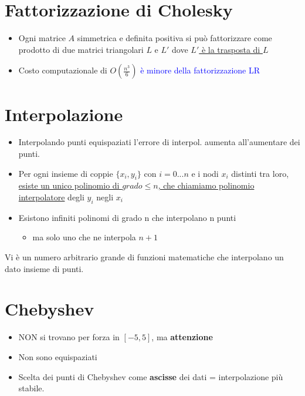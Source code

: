 \documentclass{article}
\begin{document}
	\section{Fattorizzazione di Cholesky}

		\begin{itemize}
			\item Ogni matrice $A$ simmetrica e definita positiva si può fattorizzare come prodotto di due matrici triangolari $L$ e $L'$ dove \underline{ $L'$ è la trasposta di $L$ }
			\item Costo computazionale di $O ( \frac{n^3}{6} )$ \textcolor{blue}{ è minore della fattorizzazione LR }
		\end{itemize}

	\section{Interpolazione}

		\begin{itemize}
			\item Interpolando punti equispaziati l'errore di interpol. aumenta all'aumentare dei punti.
			\item Per ogni insieme di coppie $\{ x_i, y_i \}$ con $i = 0 ... n$ e i nodi $x_i$ distinti tra loro, \\ \underline{esiste un unico polinomio di $grado \leq n$, che chiamiamo polinomio interpolatore} degli $y_i$ negli $x_i$
			\item Esistono infiniti polinomi di grado n che interpolano n punti
			\begin{itemize}
				\item ma solo uno che ne interpola $n + 1$
			\end{itemize} 
		\end{itemize}
		Vi è un numero arbitrario grande di funzioni matematiche che interpolano un dato insieme di punti.

	\section{Chebyshev}

		\begin{itemize}
			\item NON si trovano per forza in $[ -5, 5 ]$, ma \textbf{attenzione}
			\item Non sono equispaziati
			\item Scelta dei punti di Chebyshev come \textbf{ascisse} dei dati = interpolazione più stabile.
		\end{itemize}
\end{document}
